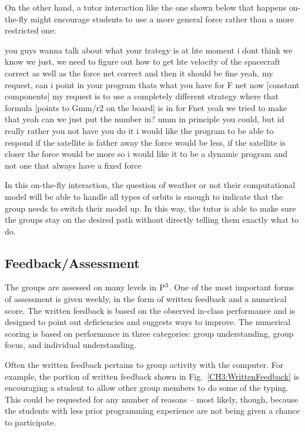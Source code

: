 \documentclass{msuphddissertation}
\begin{document}
\begin{doublespace}
On the other hand, a tutor interaction like the one shown below that happens on-the-fly might encourage students to use a more general force rather than a more restricted one:  \begin{description}\TA  you guys wanna talk about what your trategy is at hte moment
\SB  i dont think we know	
\SA we just, we need to figure out how to get hte velocity of the spacecraft correct as well as the force net correct and then it should be fine				
\TA yeah, my request, can i point in your program thats what you have for F net now [constant components] my request is to use a completely different strategy where that formula [points to Gmm/r2 on the board] is in for Fnet
\SC yeah we tried to make that yeah		
\SA can we just put the number in?				
\TA umm in principle you could, but id really rather you not have you do it i would like the program to be able to respond if the satellite is father away the force would be less, if the satellite is closer the force would be more so i would like it to be a dynamic program and not one that always have a fixed force\end{description}  In this on-the-fly interaction, the question of weather or not their computational model will be able to handle all types of orbits is enough to indicate that the group needs to switch their model up.  In this way, the tutor is able to make sure the groups stay on the desired path without directly telling them exactly what to do.

\subsection{Feedback/Assessment}

The groups are assessed on many levels in ${\rm P}^{3}$.  One of the most important forms of assessment is given weekly, in the form of written feedback and a numerical score.  The written feedback is based on the observed in-class performance and is designed to point out deficiencies and suggests ways to improve.  The numerical scoring is based on performance in three categories: group understanding, group focus, and individual understanding.

Often the written feedback pertains to group activity with the computer.  For example, the portion of written feedback shown in Fig.~\ref{CH3:WrittenFeedback} is encouraging a student to allow other group members to do some of the typing.   This could be requested for any number of reasons -- most likely, though, because the students with less prior programming experience are not being given a chance to participate.


\end{doublespace}
\end{document}
